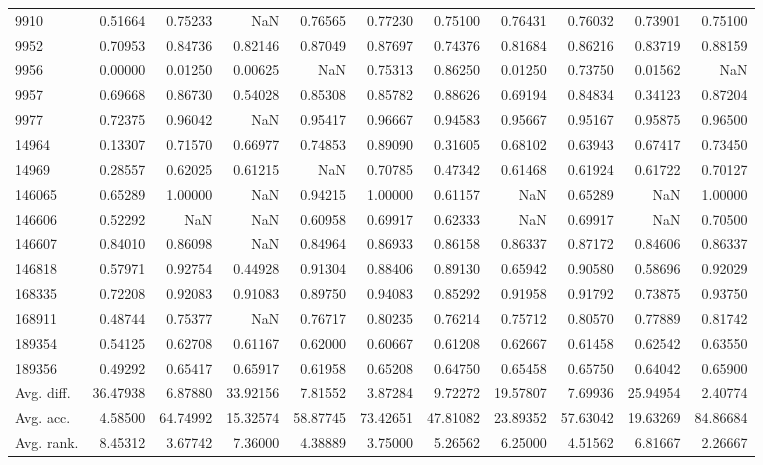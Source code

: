 \begin{tabular}{lrrrrrrrrrr}
9910 & 0.51664 & 0.75233 & NaN & 0.76565 & 0.77230 & 0.75100 & 0.76431 & 0.76032 & 0.73901 & 0.75100 \\
9952 & 0.70953 & 0.84736 & 0.82146 & 0.87049 & 0.87697 & 0.74376 & 0.81684 & 0.86216 & 0.83719 & 0.88159 \\
9956 & 0.00000 & 0.01250 & 0.00625 & NaN & 0.75313 & 0.86250 & 0.01250 & 0.73750 & 0.01562 & NaN \\
9957 & 0.69668 & 0.86730 & 0.54028 & 0.85308 & 0.85782 & 0.88626 & 0.69194 & 0.84834 & 0.34123 & 0.87204 \\
9977 & 0.72375 & 0.96042 & NaN & 0.95417 & 0.96667 & 0.94583 & 0.95667 & 0.95167 & 0.95875 & 0.96500 \\
14964 & 0.13307 & 0.71570 & 0.66977 & 0.74853 & 0.89090 & 0.31605 & 0.68102 & 0.63943 & 0.67417 & 0.73450 \\
14969 & 0.28557 & 0.62025 & 0.61215 & NaN & 0.70785 & 0.47342 & 0.61468 & 0.61924 & 0.61722 & 0.70127 \\
146065 & 0.65289 & 1.00000 & NaN & 0.94215 & 1.00000 & 0.61157 & NaN & 0.65289 & NaN & 1.00000 \\
146606 & 0.52292 & NaN & NaN & 0.60958 & 0.69917 & 0.62333 & NaN & 0.69917 & NaN & 0.70500 \\
146607 & 0.84010 & 0.86098 & NaN & 0.84964 & 0.86933 & 0.86158 & 0.86337 & 0.87172 & 0.84606 & 0.86337 \\
146818 & 0.57971 & 0.92754 & 0.44928 & 0.91304 & 0.88406 & 0.89130 & 0.65942 & 0.90580 & 0.58696 & 0.92029 \\
168335 & 0.72208 & 0.92083 & 0.91083 & 0.89750 & 0.94083 & 0.85292 & 0.91958 & 0.91792 & 0.73875 & 0.93750 \\
168911 & 0.48744 & 0.75377 & NaN & 0.76717 & 0.80235 & 0.76214 & 0.75712 & 0.80570 & 0.77889 & 0.81742 \\
189354 & 0.54125 & 0.62708 & 0.61167 & 0.62000 & 0.60667 & 0.61208 & 0.62667 & 0.61458 & 0.62542 & 0.63550 \\
189356 & 0.49292 & 0.65417 & 0.65917 & 0.61958 & 0.65208 & 0.64750 & 0.65458 & 0.65750 & 0.64042 & 0.65900 \\
Avg. diff. & 36.47938 & 6.87880 & 33.92156 & 7.81552 & 3.87284 & 9.72272 & 19.57807 & 7.69936 & 25.94954 & 2.40774 \\
Avg. acc. & 4.58500 & 64.74992 & 15.32574 & 58.87745 & 73.42651 & 47.81082 & 23.89352 & 57.63042 & 19.63269 & 84.86684 \\
Avg. rank. & 8.45312 & 3.67742 & 7.36000 & 4.38889 & 3.75000 & 5.26562 & 6.25000 & 4.51562 & 6.81667 & 2.26667 \\
\bottomrule
\end{tabular}
